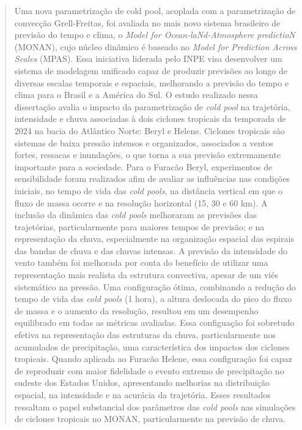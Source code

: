 \begin{abstract}
Uma nova parametrização de cold pool, acoplada com a parametrização de convecção Grell-Freitas, foi avaliada no mais novo sistema brasileiro de previsão do tempo e clima, o \textit{Model for Ocean-laNd-Atmosphere predictioN} (MONAN), cujo núcleo dinâmico é baseado no \textit{Model for Prediction Across Scales} (MPAS). Essa iniciativa liderada pelo INPE visa desenvolver um sistema de modelagem unificado capaz de produzir previsões ao longo de diversas escalas temporais e espaciais, melhorando a previsão do tempo e clima para o Brasil e a América do Sul. O estudo realizado nessa dissertação avalia o impacto da parametrização de \textit{cold pool} na trajetória, intensidade e chuva associadas à dois ciclones tropicais da temporada de 2024 na bacia do Atlântico Norte: Beryl e Helene. Ciclones tropicais são sistemas de baixa pressão intensos e organizados, associados a ventos fortes, ressacas e inundações, o que torna a sua previsão extremamente importante para a sociedade. Para o Furacão Beryl, experimentos de sensibilidade foram realizados afim de avaliar as influências nas condições iniciais, no tempo de vida das \textit{cold pools}, na distância vertical em que o fluxo de massa ocorre e na resolução horizontal (15, 30 e 60 km). A inclusão da dinâmica das \textit{cold pools} melhoraram as previsões das trajetórias, particularmente para maiores tempos de previsão; e na representação da chuva, especialmente na organização espacial das espirais das bandas de chuva e das chuvas intensas. A previsão da intensidade do vento também foi melhorada por conta do benefício de utilizar uma representação mais realista da estrutura convectiva, apesar de um viés sistemático na pressão. Uma configuração ótima, combinando a redução do tempo de vida das \textit{cold pools} (1 hora), a altura deslocada do pico do fluxo de massa e o aumento da resolução, resultou em um desempenho equilibrado em todas as métricas avaliadas. Essa configuação foi sobretudo efetiva na representação das estruturas da chuva, particularmente nos acumulados de precipitação, uma característica dos impactos dos ciclones tropicais. Quando aplicada ao Furacão Helene, essa configuração foi capaz de reproduzir com maior fidelidade o evento extremo de precipitação no sudeste dos Estados Unidos, apresentando melhorias na distribuição espacial, na intensidade e na acurácia da trajetória. Esses resultados ressaltam o papel substancial dos parâmetros das \textit{cold pools} nas simulações de ciclones tropicais no MONAN, particularmente na previsão de chuva.



\end{abstract}